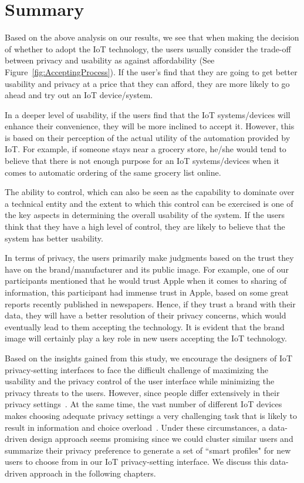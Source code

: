\section{Summary}
Based on the above analysis on our results, we see that when making the decision of whether to adopt the IoT technology, the users usually consider the trade-off between privacy and usability as against affordability (See Figure~\ref{fig:AcceptingProcess}). If the user's find that they are going to get better usability and privacy at a price that they can afford, they are more likely to go ahead and try out an IoT device/system. 

In a deeper level of usability, if the users find that the IoT systems/devices will enhance their convenience, they will be more inclined to accept it. However, this is based on their perception of the actual utility of the automation provided by IoT. For example, if someone stays near a grocery store, he/she would tend to believe that there is not enough purpose for an IoT systems/devices when it comes to automatic ordering of the same grocery list online. 

The ability to control, which can also be seen as the capability to dominate over a technical entity and the extent to which this control can be exercised is one of the key aspects in determining the overall usability of the system. If the users think that they have a high level of control, they are likely to believe that the system has better usability.

In terms of privacy, the users primarily make judgments based on the trust they have on the brand/manufacturer and its public image. For example, one of our participants mentioned that he would trust Apple when it comes to sharing of information, this participant had immense trust in Apple, based on some great reports recently published in newspapers. Hence, if they trust a brand with their data, they will have a better resolution of their privacy concerns, which would eventually lead to them accepting the technology. It is evident that the brand image will certainly play a key role in new users accepting the IoT technology.

Based on the insights gained from this study, we encourage the designers of IoT privacy-setting interfaces to face the difficult challenge of maximizing the usability and the privacy control of the user interface while minimizing the privacy threats to the users. However, since people differ extensively in their privacy settings~\cite{olson2005study}. At the same time, the vast number of different IoT devices makes choosing adequate privacy settings a very challenging task that is likely to result in information and choice overload~\cite{williams2016perfect}. Under these circumstances, a data-driven design approach seems promising since we could cluster similar users and summarize their privacy preference to generate a set of ``smart profiles" for new users to choose from in our IoT privacy-setting interface. We discuss this data-driven approach in the following chapters.
